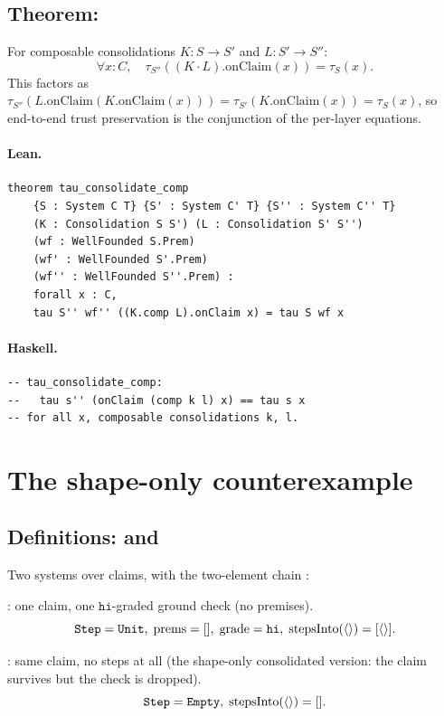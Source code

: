 \documentclass[11pt,a4paper]{article}
\begin{document}
\subsection{Theorem: }

\begin{thm}
For composable consolidations $K : S \to S'$ and $L : S' \to S''$:
\[
  \forall x : C,\quad
  \tau_{S''}((K \cdot L).\mathrm{onClaim}(x)) = \tau_S(x).
\]
This factors as $\tau_{S''}(L.\mathrm{onClaim}(K.\mathrm{onClaim}(x)))
= \tau_{S'}(K.\mathrm{onClaim}(x)) = \tau_S(x)$, so end-to-end trust
preservation is the conjunction of the per-layer equations.
\end{thm}

\paragraph{Lean.}
\begin{lstlisting}[style=lean]
theorem tau_consolidate_comp
    {S : System C T} {S' : System C' T} {S'' : System C'' T}
    (K : Consolidation S S') (L : Consolidation S' S'')
    (wf : WellFounded S.Prem)
    (wf' : WellFounded S'.Prem)
    (wf'' : WellFounded S''.Prem) :
    forall x : C,
    tau S'' wf'' ((K.comp L).onClaim x) = tau S wf x
\end{lstlisting}

\paragraph{Haskell.}
\begin{lstlisting}[style=haskell]
-- tau_consolidate_comp:
--   tau s'' (onClaim (comp k l) x) == tau s x
-- for all x, composable consolidations k, l.
\end{lstlisting}

\section{The shape-only counterexample}

\subsection{Definitions:  and }

\begin{defn}
Two systems over  claims, with the two-element chain :

\textbf{}: one claim, one $\mathtt{hi}$-graded ground check
(no premises).
\[
  \texttt{Step} = \texttt{Unit},\;
  \mathrm{prems} = [],\;
  \mathrm{grade} = \mathtt{hi},\;
  \mathrm{stepsInto}(\langle\rangle) = [\langle\rangle].
\]

\textbf{}: same claim, no steps at all (the shape-only
consolidated version: the claim survives but the check is dropped).
\[
  \texttt{Step} = \texttt{Empty},\;
  \mathrm{stepsInto}(\langle\rangle) = [].
\]
\end{defn}
\end{document}
